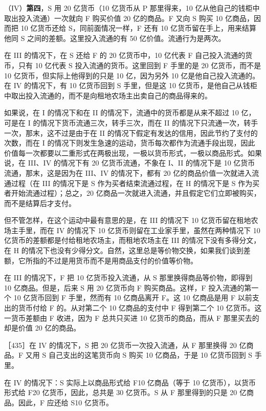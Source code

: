 （IV）\textbf{第四}，S 用 20 亿货币（10 亿货币从 P 那里得来，10 亿从他自己的钱柜中取出投入流通）一次就向 F 购买价值 20 亿的商品。F 又向 S 购买 10 亿商品，因而把 10 亿货币还给 S，同前面情况一样，F 还有 10 亿货币留在手上，用来结算他同 S 之间的差额。这里投入流通的有 50 亿价值。流通行为是两次。

在 III 的情况下，在 S 还给 F 的 20 亿货币中，10 亿代表 F 自己投入流通的货币，只有 10 亿代表 S 投入流通的货币。这里回到 F 手里的是 20 亿货币，而不是 10 亿货币，但实际上他得到的只是 10 亿，因为另外 10 亿是他自己投入流通的。在 IV 的情况下，有 10 亿货币回到 S 手里，但是这 10 亿货币，是他自己从钱柜中取出投入流通的，而不是向租地农场主出卖自己的商品得来的。

如果说，在 I 的情况下和在 II 的情况下，流通中的货币都是从来不超过 10 亿，可是在 I 的情况下货币流通三次，转手三次，而在 II 的情况下只流通一次，转手一次，那末，这不过是由于在 II 的情况下假定有发达的信用，因此节约了支付的次数，而在 I 的情况下则发生急速的运动，货币每次都作为流通手段出现，因此价值每一次都要以二重形式在两极出现，一极以货币形式，一极以商品形式。如果说，在 III、IV 的情况下有 20 亿货币流通，不象在 I、II 的情况下是 10 亿货币流通，那末，这是因为在 III、IV 的情况下，都有 20 亿的商品价值一次就进入流通过程（在 III 的情况下是 S 作为买者结束流通过程，在 H 的情况下是 S 作为买者开始流通过程）；总之，20 亿商品一次就进入流通，并且假定它们立即被购买，而不是结算后才支付。

但不管怎样，在这个运动中最有意思的是，在 III 的情况下 10 亿货币留在租地农场主手里，而在 IV 的情况下 10 亿货币则留在工业家手里，虽然在两种情况下 10 亿货币的差额都是付给租地农场主，而租地农场主在 III 的情况下没有多得分文，在 H 的情况下也没有少得分文。自然，这里总是等价物交换，如果我们谈到差额，它所指的不过是用货币而不是用商品支付的价值等价物。

在 III 的情况下，F 把 10 亿货币投入流通，从 S 那里换得商品等价物，即得到 10 亿商品。但是，后来 S 用 20 亿货币向 F 购买商品。这样，F 投入流通的第一个 10 亿货币回到 F 手里，然而有 10 亿商品离开 F。这 10 亿商品是用 F 以前支出的货币付给 F 的。从对第二个 10 亿商品的支付中 F 得到第二个 10 亿货币。这一货币差额由 F 收进，因为 F 总共只买进 10 亿货币的商品，而从 F 那里买去的却是价值 20 亿的商品。

［435］在 IV 的情况下，S 把 20 亿货币一次投入流通，从 F 那里换得 20 亿商品。F 又用 S 自己支出的这笔货币向 S 购买 10 亿商品，于是 10 亿货币回到 S 手里。

在 IV 的情况下：S 实际上以商品形式给 F10 亿商品（等于 10 亿货币），以货币形式给 F20 亿货币，因此，总共是 30 亿货币。S 从 F 那里得到的只是 20 亿商品。因此，F 应还给 S10 亿货币。

